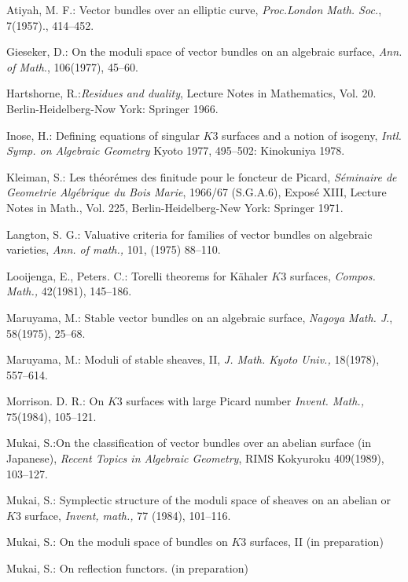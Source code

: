 \begin{thebibliography}{99}
{Atiyah, M. F.}: Vector bundles over an elliptic curve,
\textit{Proc.London Math. Soc.}, 7(1957)., 414--452.

{Gieseker, D.}: On the moduli space of vector bundles on an
algebraic surface, \textit{Ann. of Math}., 106(1977), 45--60.

{Hartshorne, R.}:\pageoriginale \textit{Residues and duality}, Lecture Notes
in Mathematics, Vol. 20. Berlin-Heidelberg-Now York: Springer 1966.

{Inose, H.}: Defining equations of singular $K3$ surfaces and a
notion of isogeny, \textit{Intl. Symp. on Algebraic Geometry} Kyoto
1977, 495--502: Kinokuniya 1978.

{Kleiman, S.}: Les th\'{e}or\'{e}mes des finitude pour le
foncteur de Picard, \textit{S\'{e}minaire de Geometrie Alg\'{e}brique
  du Bois Marie}, 1966/67 (S.G.A.6), Expos\'e XIII, Lecture Notes in
Math., Vol. 225, Berlin-Heidelberg-New York: Springer 1971.

{Langton, S. G.}: Valuative criteria for families of vector
bundles on algebraic varieties, \textit{Ann. of math.,} 101, (1975)
88--110.

{Looijenga, E., Peters. C.}: Torelli theorems for K\"{a}haler
$K3$ surfaces, \textit{Compos. Math.,} 42(1981), 145--186.

{Maruyama, M.}: Stable vector bundles on an algebraic surface,
\textit{Nagoya Math. J}., 58(1975), 25--68.

{Maruyama, M.}: Moduli of stable sheaves, II, \textit{J. Math. Kyoto
Univ.,} 18(1978), 557--614.

{Morrison. D. R.}: On $K3$ surfaces with large Picard number
\textit{Invent. Math.,} 75(1984), 105--121.

{Mukai, S.}:\pageoriginale On the classification of vector bundles over an
abelian surface (in Japanese), \textit{Recent Topics in Algebraic
  Geometry}, RIMS Kokyuroku 409(1989), 103--127. 

{Mukai, S.}: Symplectic structure of the moduli space of
sheaves on an abelian or $K3$ surface, \textit{Invent, math.,} 77
(1984), 101--116.

{Mukai, S.}: On the moduli space of bundles on $K3$ surfaces,
II (in preparation)

{Mukai, S.}: On reflection functors. (in preparation)


\end{thebibliography}
